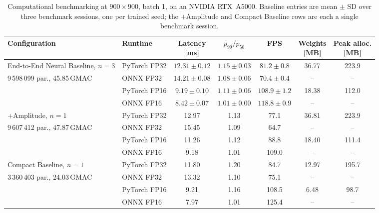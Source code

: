 \begin{table}[!htbp]
\centering
\caption{Computational benchmarking at $900\times900$, batch 1, on an NVIDIA
RTX~A5000. Baseline entries are mean $\pm$ SD over three benchmark sessions,
one per trained seed; the +Amplitude and Compact Baseline rows are each a
single benchmark session.}
\label{tab:efficiency}
\footnotesize
\begin{tabular*}{\textwidth}{@{\extracolsep{\fill}}llccccc@{}}
\toprule
Configuration & Runtime & \shortstack{Latency\\{[ms]}} & $p_{99}/p_{50}$ & FPS & \shortstack{Weights\\{[MB]}} & \shortstack{Peak alloc.\\{[MB]}} \\
\midrule
End-to-End Neural Baseline, $n=3$ & PyTorch FP32 & $12.31 \pm 0.12$ & $1.15 \pm 0.03$ & $81.2 \pm 0.8$ & 36.77 & 223.9 \\
9\,598\,099 par., 45.85\,GMAC & ONNX FP32 & $14.21 \pm 0.08$ & $1.08 \pm 0.06$ & $70.4 \pm 0.4$ & -- & -- \\
 & PyTorch FP16 & $9.19 \pm 0.10$ & $1.11 \pm 0.06$ & $108.9 \pm 1.2$ & 18.38 & 112.0 \\
 & ONNX FP16 & $8.42 \pm 0.07$ & $1.01 \pm 0.00$ & $118.8 \pm 0.9$ & -- & -- \\
\midrule
+Amplitude, $n=1$ & PyTorch FP32 & 12.97 & 1.13 & 77.1 & 36.81 & 223.9 \\
9\,607\,412 par., 47.87\,GMAC & ONNX FP32 & 15.45 & 1.09 & 64.7 & -- & -- \\
 & PyTorch FP16 & 11.26 & 1.12 & 88.8 & 18.40 & 111.4 \\
 & ONNX FP16 & 9.18 & 1.01 & 109.0 & -- & -- \\
\midrule
Compact Baseline, $n=1$ & PyTorch FP32 & 11.80 & 1.20 & 84.7 & 12.97 & 195.7 \\
3\,360\,403 par., 24.03\,GMAC & ONNX FP32 & 13.32 & 1.10 & 75.1 & -- & -- \\
 & PyTorch FP16 & 9.21 & 1.16 & 108.5 & 6.48 & 98.7 \\
 & ONNX FP16 & 7.97 & 1.01 & 125.4 & -- & -- \\
\bottomrule
\end{tabular*}
\end{table}
